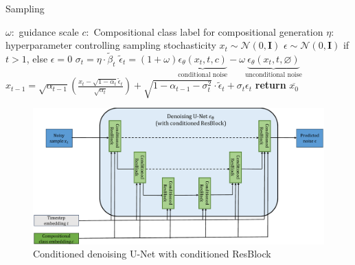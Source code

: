 \begin{algorithm}
\caption{Sampling}
\label{sampling}
\vspace{2mm}
\begin{algorithmic}[1]
\Require $\omega:$ guidance scale \vspace{2mm}
\Require $c:$ Compositional class label for compositional generation
\Require $\eta:$ hyperparameter controlling sampling stochasticity \vspace{2mm}
\State $x_t \sim \mathcal{N}(0, \textbf{I})$ \vspace{2mm}
 \vspace{2mm}
    \State $\epsilon \sim \mathcal{N}(0, \textbf{I})$ if $t > 1$, else $\epsilon = 0$ \vspace{2mm}
    \State $\sigma_t = \eta \cdot \tilde{\beta}_t$ \vspace{2mm}
    \State $\tilde{\epsilon}_t = (1 + \omega)\underbrace{\epsilon_\theta(x_t, t, c)}_{\text{conditional noise}} - \omega\underbrace{\epsilon_\theta(x_t, t, \varnothing)}_{\text{unconditional noise}}$ \vspace{4mm}
    \State $x_{t-1} = \sqrt{\alpha_{t-1}}(\frac{x_t - \sqrt{1 - \alpha_t}\tilde{\epsilon}_t}{\sqrt{\alpha_t}}) + \sqrt{1 - \alpha_{t-1} - \sigma_t^2} \cdot \tilde{\epsilon}_t + \sigma_t\epsilon_t$ \vspace{2mm}
\EndFor \vspace{2mm}
\State \textbf{return} $\overline{x_0}$ \vspace{2mm}
\end{algorithmic} 
\end{algorithm}

\begin{figure} [H]
    \centering
    \includegraphics[width=1\linewidth]{figures/UNetRes.pdf}
    \caption{Conditioned denoising U-Net with conditioned ResBlock}
    \label{fig:unetres}
\end{figure}

